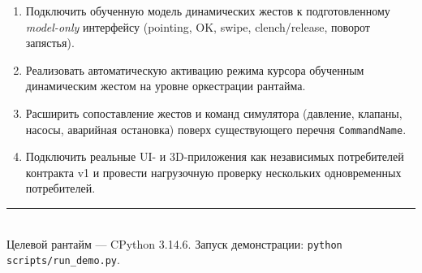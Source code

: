 \documentclass[11pt,a4paper]{article}
\begin{document}
\begin{enumerate}[leftmargin=1.6em]
  \item Подключить обученную модель динамических жестов к подготовленному
        \emph{model-only} интерфейсу (pointing, OK, swipe, clench/release, поворот запястья).
  \item Реализовать автоматическую активацию режима курсора обученным динамическим жестом на
        уровне оркестрации рантайма.
  \item Расширить сопоставление жестов и команд симулятора (давление, клапаны, насосы,
        аварийная остановка) поверх существующего перечня \texttt{CommandName}.
  \item Подключить реальные UI- и 3D-приложения как независимых потребителей контракта v1 и
        провести нагрузочную проверку нескольких одновременных потребителей.
\end{enumerate}

\vspace{0.8cm}
\noindent\textcolor{rulec}{\rule{\linewidth}{0.6pt}}\\[4pt]
{\small\color{softgray} Целевой рантайм — CPython 3.14.6. Запуск демонстрации:
\texttt{python scripts/run\_demo.py}.}
\end{document}

